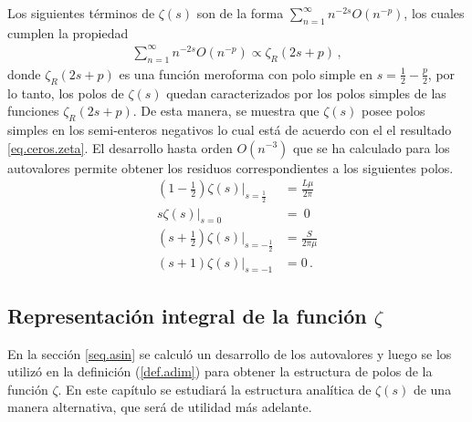 Los siguientes términos de $\zeta (s)$ son de la forma $\sum _{n=1} ^{\infty} n ^{-2s} O ( n ^{-p})$, los cuales cumplen la propiedad
\begin{align}
	\sum _{n=1} ^{\infty} n ^{-2s} O ( n ^{-p}) 
	\propto
	\zeta _R (2s+p)
	\, ,
\end{align}
donde $\zeta _R (2s+p)$ es una función meroforma con polo simple en $s = \frac{1}{2} - \frac{p}{2}$,
por lo tanto, los polos de $\zeta (s)$ quedan caracterizados por los polos simples de las funciones  $\zeta _R (2s+p)$. De esta manera, se muestra que $\zeta (s)$ posee polos simples en los semi-enteros negativos lo cual está de acuerdo con el el resultado \eqref{eq.ceros.zeta}. El desarrollo hasta orden $O(n^{-3})$ que se ha calculado para los autovalores permite obtener los residuos correspondientes a los siguientes polos.
\begin{equation}
\begin{aligned}\label{eq.polos.asin}
	\left(1- \frac{1}{2} \right) \zeta  (s)| _{s=\frac{1}{2}} &= 
\frac{L \mu }{2 \pi } 
\\[5pt]
	s \zeta  (s) |_{s=0} &= \ 0 
\\[5pt]
	\left( s + \frac{1}{2} \right)\zeta  (s) | _{s=-\frac{1}{2}} &= 		\frac{S}{2 \pi \mu } 
\\[5pt]
	(s+1) \zeta (s) |_{s=-1} &=  0
	\, .
\end{aligned}
\end{equation}



\subsection{Representación integral de la función $\zeta$}
{\label{sec.complejo}}

En la sección \ref{seq.asin} se calculó un desarrollo de los autovalores y luego se
los utilizó en la definición (\ref{def.adim}) para obtener
la estructura de polos de la función $\zeta$. En este capítulo se estudiará la
estructura analítica de $\zeta (s)$ de una manera alternativa, que será de utilidad
más adelante.

